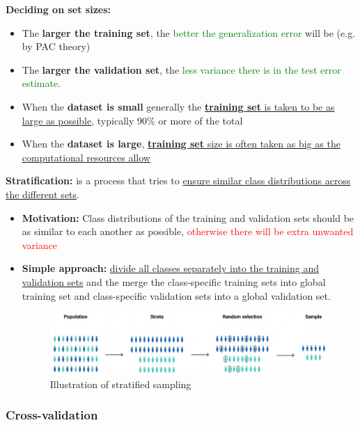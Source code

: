 \documentclass[12pt, a4paper]{article}
\begin{document}
\textbf{Deciding on set sizes:}
\begin{itemize}
  \item The \textbf{larger the training set}, the \textcolor{Green}{better the generalization error} will be (e.g. by PAC theory)
  \item The \textbf{larger the validation set}, the \textcolor{Green}{less variance there is in the test error estimate}.
  \item When the \textbf{dataset is small} generally the \uline{\textbf{training set} is taken to be as large as possible}, typically 90\% or more of the total
  \item When the \textbf{dataset is large}, \uline{\textbf{training set} size is often taken as big as the computational resources allow}
\end{itemize}

\bigskip

\textbf{Stratification:} is a process that tries to \uline{ensure similar class distributions across the different sets}.
\begin{itemize}
  \item \textbf{Motivation:} Class distributions of the training and validation sets should be as similar to each another as possible, \textcolor{red}{otherwise there will be extra unwanted variance}
  \item \textbf{Simple approach:} \uline{divide all classes separately into the training and validation sets} and the merge the class-specific training sets into global training set and class-specific validation sets into a global validation set.
  \begin{figure}[H]
    \centering  %
      \includegraphics[width=1.0\columnwidth]{images/stratified-sampling.jpg}
      \caption{Illustration of stratified sampling}
      \label{fig:stratified-sampling}
  \end{figure}
\end{itemize}









\subsubsection{Cross-validation}\label{cross-validation}
\end{document}
